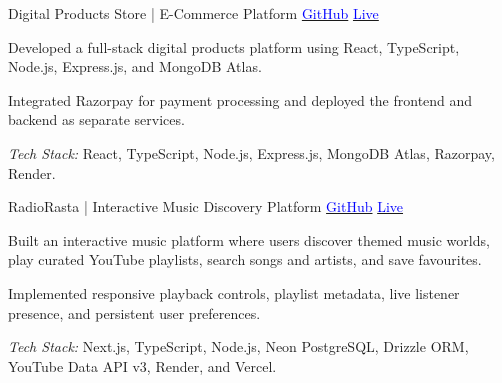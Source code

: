 \begin{cventries}

  \cventry
    {Digital Products Store \textnormal{| E-Commerce Platform}}
    {{\href{https://github.com/hrithikksingh3/StoreCodersvoice}{\textcolor{blue}{GitHub}} \hspace{4pt} \href{https://storecodersvoice.onrender.com/}{\textcolor{blue}{Live}}}}
    {
      \begin{cvitems}
        \item {Developed a full-stack digital products platform using React, TypeScript, Node.js, Express.js, and MongoDB Atlas.}
        \item {Integrated Razorpay for payment processing and deployed the frontend and backend as separate services.}
        \item {\textit{Tech Stack:} React, TypeScript, Node.js, Express.js, MongoDB Atlas, Razorpay, Render.}
      \end{cvitems}
    }

\cventry
  {RadioRasta \textnormal{| Interactive Music Discovery Platform}}
  {{\href{https://github.com/hrithikksingh3/RadioRasta}{\textcolor{blue}{GitHub}} \hspace{4pt} \href{https://radiorasta.onrender.com/}{\textcolor{blue}{Live}}}}
  {
    \begin{cvitems}
      \item {Built an interactive music platform where users discover themed music worlds, play curated YouTube playlists, search songs and artists, and save favourites.}
      \item {Implemented responsive playback controls, playlist metadata, live listener presence, and persistent user preferences.}
      \item {\textit{Tech Stack:} Next.js, TypeScript, Node.js, Neon PostgreSQL, Drizzle ORM, YouTube Data API v3, Render, and Vercel.}
    \end{cvitems}
  }

\end{cventries}
